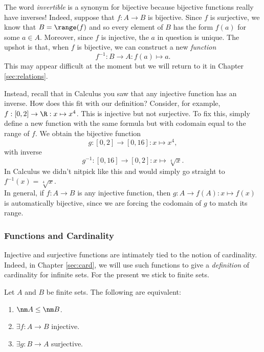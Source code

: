 \begin{aside}

The word \emph{invertible} is a synonym for bijective because bijective functions really have inverses! Indeed, suppose that $f:A\to B$ is bijective. Since $f$ is surjective, we know that $B=\range(f)$ and so every element of $B$ has the form $f(a)$ for some $a\in A$. Moreover, since $f$ is injective, the $a$ in question is unique. The upshot is that, when $f$ is bijective, we can construct a new \emph{function}
\[f^{-1}:B\to A:f(a)\mapsto a.\]
This may appear difficult at the moment but we will return to it in Chapter \ref{sec:relations}.

Instead, recall that in Calculus you saw that any injective function has an inverse. How does this fit with our definition? Consider, for example, $f:[0,2]\to\R:x\mapsto x^4$. This is injective but not surjective. To fix this, simply define a new function with the same formula but with codomain equal to the range of $f$. We obtain the bijective function
\[g:[0,2]\to[0,16]:x\mapsto x^4,\]
with inverse
\[g^{-1}:[0,16]\to[0,2]:x\mapsto \sqrt[4]{x}.\]
In Calculus we didn't nitpick like this and would simply go straight to $f^{-1}(x)=\sqrt[4]{x}$.\\[5pt]
In general, if $f:A\to B$ is any injective function, then $g:A\to f(A):x\mapsto f(x)$ is automatically bijective, since we are forcing the codomain of $g$ to match its range.
\end{aside}

\subsubsection*{Functions and Cardinality}

Injective and surjective functions are intimately tied to the notion of cardinality. Indeed, in Chapter \ref{sec:card}, we will use such functions to give a \emph{definition} of cardinality for infinite sets. For the present we stick to finite sets. 

\begin{thm}\label{thm:finitecard}
Let $A$ and $B$ be finite sets. The following are equivalent:
\begin{enumerate}\setlength{\itemsep}{0pt}
  \item $\nm A\le\nm B$.
  \item $\exists f:A\to B$ injective.
  \item $\exists g:B\to A$ surjective.
\end{enumerate}
\end{thm}

